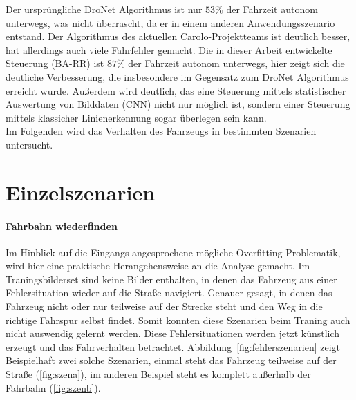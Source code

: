 Der ursprüngliche DroNet Algorithmus ist nur $53 \%$ der Fahrzeit autonom unterwegs, was nicht überrascht, da er in einem anderen Anwendungsszenario entstand. Der Algorithmus des aktuellen Carolo-Projektteams ist deutlich besser, hat allerdings auch viele Fahrfehler gemacht. Die in dieser Arbeit entwickelte Steuerung (BA-RR) ist $87 \%$ der Fahrzeit autonom unterwegs, hier zeigt sich die deutliche Verbesserung, die insbesondere im Gegensatz zum DroNet Algorithmus erreicht wurde. Außerdem wird deutlich, das eine Steuerung mittels statistischer Auswertung von Bilddaten (CNN) nicht nur möglich ist, sondern einer Steuerung mittels klassicher Linienerkennung sogar überlegen sein kann. \\
Im Folgenden wird das Verhalten des Fahrzeugs in bestimmten Szenarien untersucht.

\section{Einzelszenarien}

\paragraph{Fahrbahn wiederfinden}
Im Hinblick auf die Eingangs angesprochene mögliche Overfitting-Problematik, wird hier eine praktische Herangehensweise an die Analyse gemacht.
Im Traningsbilderset sind keine Bilder enthalten, in denen das Fahrzeug aus einer Fehlersituation wieder auf die Straße navigiert. Genauer gesagt, in denen das Fahrzeug nicht oder nur teilweise auf der Strecke steht und den Weg in die richtige Fahrspur selbst findet. Somit konnten diese Szenarien beim Traning auch nicht \glqq auswendig \grqq{} gelernt werden. Diese Fehlersituationen werden jetzt künstlich erzeugt und das Fahrverhalten betrachtet.
Abbildung~\ref{fig:fehlerszenarien} zeigt Beispielhaft zwei solche Szenarien, einmal steht das Fahrzeug teilweise auf der Straße (\ref{fig:szena}), im anderen Beispiel steht es komplett außerhalb der Fahrbahn (\ref{fig:szenb}).


